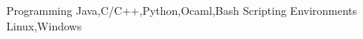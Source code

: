 

\begin{cvskills}


 \cvskill 
     {Programming} %
     {Java,C/C++,Python,Ocaml,Bash Scripting} %
 \cvskill
     {Environments}  %
     {Linux,Windows} %
    

\end{cvskills}

